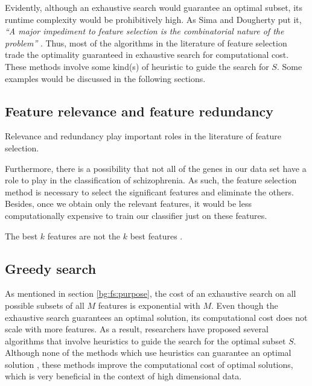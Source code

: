 \documentclass[12pt, twoside, a4paper]{report}
\begin{document}
Evidently, although an exhaustive search would guarantee an optimal subset, its runtime complexity would be prohibitively high. As Sima and Dougherty put it, \textit{``A major impediment to feature selection is the combinatorial nature of the problem''} \cite{RefWorks:191}. Thus, most of the algorithms in the literature of feature selection trade the optimality guaranteed in exhaustive search for computational cost. These methods involve some kind(s) of heuristic to guide the search for $S$. Some examples would be discussed in the following sections.

\subsection{Feature relevance and feature redundancy} \label{bg:fs:relevance}

Relevance and redundancy play important roles in the literature of feature selection.




Furthermore, there is a possibility that not all of the genes in our data set have a role to play in the classification of schizophrenia. As such, the feature selection method is necessary to select the significant features and eliminate the others. Besides, once we obtain only the relevant features, it would be less computationally expensive to train our classifier just on these features.

The best $k$ features are not the $k$ best features \cite{RefWorks:182}.

\subsection{Greedy search} \label{bg:fs:greedy}

As mentioned in section \ref{bg:fs:purpose}, the cost of an exhaustive search on all possible subsets of all $M$ features is exponential with $M$. Even though the exhaustive search guarantees an optimal solution, its computational cost does not scale with more features. As a result, researchers have proposed several algorithms that involve heuristics to guide the search for the optimal subset $S$. Although none of the methods which use heuristics can guarantee an optimal solution \cite{RefWorks:182}, these methods improve the computational cost of optimal solutions, which is very beneficial in the context of high dimensional data.
\end{document}
